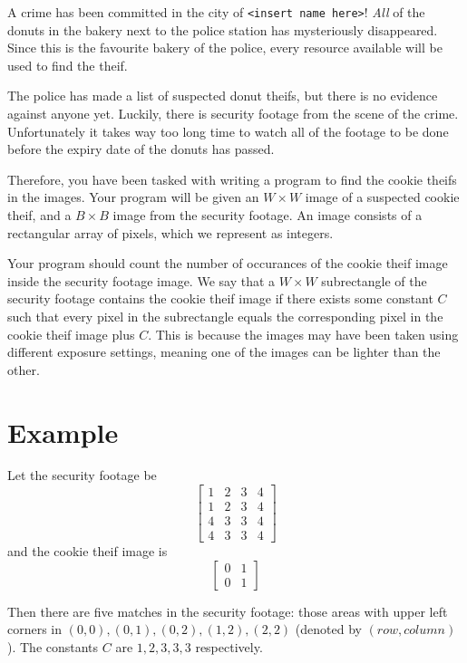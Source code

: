 \newcommand\version{v1}
A crime has been committed in the city of \texttt{<insert name here>}! \emph{All} of the donuts in the bakery next to the police station
has mysteriously disappeared. Since this is the favourite bakery of the police, every resource available will be used to find the theif.

The police has made a list of suspected donut theifs, but there is no evidence against anyone yet.
Luckily, there is security footage from the scene of the crime. Unfortunately it takes way too long time
to watch all of the footage to be done before the expiry date of the donuts has passed.

Therefore, you have been tasked with writing a program to find the cookie theifs in the images.
Your program will be given an $W \times W$ image of a suspected cookie theif, and a $B \times B$
image from the security footage. An image consists of a rectangular array of pixels, which we
represent as integers.

Your program should count the number of occurances of the cookie theif image inside the security footage image.
We say that a $W \times W$ subrectangle of the security footage contains the cookie theif image if there exists
some constant $C$ such that every pixel in the subrectangle equals the corresponding pixel in the cookie theif image
plus $C$. This is because the images may have been taken using different exposure settings, meaning one of the images
can be lighter than the other.


\section*{Example}
Let the security footage be
\[
\begin{bmatrix}
  1 & 2 & 3 & 4 \\
  1 & 2 & 3 & 4 \\
  4 & 3 & 3 & 4 \\
  4 & 3 & 3 & 4
\end{bmatrix}
\]
and the cookie theif image is
\[
\begin{bmatrix}
  0 & 1 \\
  0 & 1
\end{bmatrix}
\]

Then there are five matches in the security footage: those areas with upper left corners in $(0, 0), (0, 1), (0, 2), (1, 2), (2, 2)$ (denoted by $(row, column)$).
The constants $C$ are $1, 2, 3, 3, 3$ respectively.

